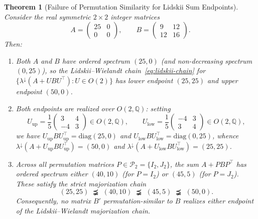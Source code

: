 \documentclass[11pt]{article}
\newtheorem{theorem}{Theorem}[section]
\theoremstyle{definition}
\theoremstyle{remark}
\newcommand{\Q}{\mathbb{Q}}
\newcommand{\Ptwo}{\mathcal{P}_2}
\newcommand{\diag}{\mathrm{diag}}
\begin{document}
\begin{theorem}[Failure of Permutation Similarity for Lidskii Sum Endpoints]
\label{thm:reading-ii}
Consider the real symmetric $2 \times 2$ integer matrices
\[
  A = \begin{pmatrix} 25 & 0 \\ 0 & 0 \end{pmatrix},
  \qquad
  B = \begin{pmatrix} 9 & 12 \\ 12 & 16 \end{pmatrix}.
\]
Then:
\begin{enumerate}
  \item Both $A$ and $B$ have ordered spectrum $(25,0)$ (and non-decreasing
  spectrum $(0,25)$), so the Lidskii--Wielandt chain~\eqref{eq:lidskii-chain} for
  $\{ \lambda^\downarrow(A + U B U^\top) : U \in O(2) \}$ has lower endpoint
  $(25,25)$ and upper endpoint $(50,0)$.
  \item Both endpoints are realized over $O(2,\Q)$: setting
  \[
    U_{\mathrm{up}} = \frac{1}{5}\begin{pmatrix} 3 & 4 \\ -4 & 3 \end{pmatrix} \in O(2,\Q),
    \qquad
    U_{\mathrm{low}} = \frac{1}{5}\begin{pmatrix} -4 & 3 \\ 3 & 4 \end{pmatrix} \in O(2,\Q),
  \]
  we have $U_{\mathrm{up}} B U_{\mathrm{up}}^\top = \diag(25,0)$ and
  $U_{\mathrm{low}} B U_{\mathrm{low}}^\top = \diag(0,25)$, whence
  $\lambda^\downarrow(A + U_{\mathrm{up}} B U_{\mathrm{up}}^\top) = (50,0)$ and
  $\lambda^\downarrow(A + U_{\mathrm{low}} B U_{\mathrm{low}}^\top) = (25,25)$.
  \item Across \emph{all} permutation matrices $P \in \Ptwo = \{I_2, J_2\}$, the
  sum $A + P B P^\top$ has ordered spectrum either $(40,10)$ (for $P = I_2$) or
  $(45,5)$ (for $P = J_2$). These satisfy the strict majorization chain
  \begin{equation}
    \label{eq:strict-chain}
    (25,25) \;\precneqq\; (40,10) \;\precneqq\; (45,5) \;\precneqq\; (50,0).
  \end{equation}
  Consequently, \emph{no} matrix $B'$ permutation-similar to $B$ realizes either
  endpoint of the Lidskii--Wielandt majorization chain.
\end{enumerate}
\end{theorem}
\end{document}
